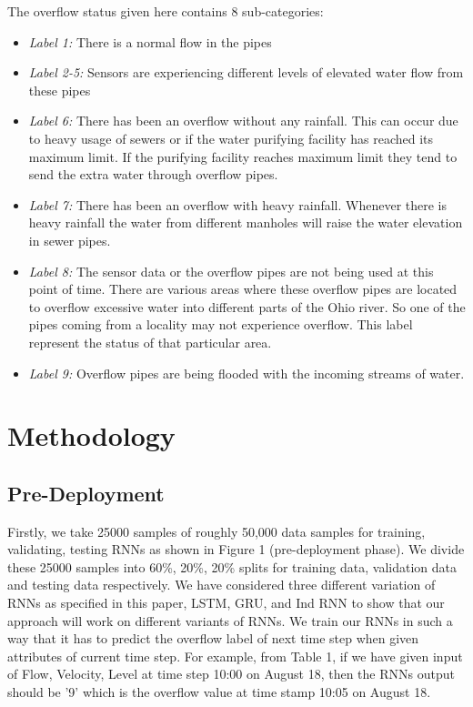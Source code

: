 \documentclass[sigconf,authordraft]{acmart}
\begin{document}
The overflow status given here contains 8 sub-categories:
\begin{itemize}
  \item \emph{Label 1:} There is a normal flow in the pipes 
  \item \emph{Label 2-5:} Sensors are experiencing different levels of elevated water flow from these pipes
  \item \emph{Label 6:} There has been an overflow without any rainfall. This can occur due to heavy usage of sewers or if the water purifying facility has reached its maximum limit. If the purifying facility reaches maximum limit they tend to send the extra water through overflow pipes. 
  \item \emph{Label 7:} There has been an overflow with heavy rainfall. Whenever there is heavy rainfall the water from different manholes will raise the water elevation in sewer pipes.
  \item \emph{Label 8:} The sensor data or the overflow pipes are not being used at this point of time. There are various areas where these overflow pipes are located to overflow excessive water into different parts of the Ohio river. So one of the pipes coming from a locality may not experience overflow. This label represent the status of that particular area.
  \item \emph{Label 9:} Overflow pipes are being flooded with the incoming streams of water. 
\end{itemize}



\section{Methodology}

\subsection{Pre-Deployment}
Firstly, we take 25000 samples of roughly 50,000 data samples for training, validating, testing RNNs as shown in Figure 1 (pre-deployment phase). We divide these 25000 samples into 60\%, 20\%, 20\% splits for training data, validation data and testing data respectively. We have considered three different variation of RNNs as specified in this paper, LSTM, GRU, and Ind RNN to show that our approach will work on different variants of RNNs. We train our RNNs in such a way that it has to predict the overflow label of next time step when given attributes of current time step. For example, from Table 1, if we have given input of Flow, Velocity, Level at time step 10:00 on August 18, then the RNNs output should be '9' which is the overflow value at time stamp 10:05 on August 18.
\end{document}
